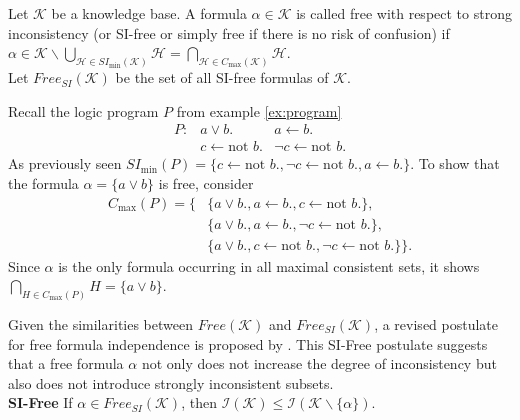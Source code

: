 \begin{definition}
    Let \(\mathcal{K}\) be a knowledge base. A formula \(\alpha \in \mathcal{K}\) is called free with respect to strong inconsistency (or SI-free or simply free if there is no risk of confusion) if\\
    \(\alpha \in \mathcal{K} \backslash \bigcup\limits_{\mathcal{H} \in SI_{\min}(\mathcal{K})} \mathcal{H} = \bigcap\limits_{\mathcal{H} \in C_{\max}(\mathcal{K})} \mathcal{H}\).\\
    Let \(Free_{SI}(\mathcal{K})\) be the set of all SI-free formulas of \(\mathcal{K}\).
\end{definition}

\begin{example}
    Recall the logic program \(P\) from example \ref{ex:program}
    \[\begin{array}{rrr}
            P: & a \lor b.                  & a \leftarrow b.                 \\
               & c \leftarrow \text{not }b. & \neg c \leftarrow \text{not }b.
        \end{array}\]
    As previously seen \(SI_{\min}(P) = \{c \leftarrow \text{not }b., \neg c \leftarrow \text{not }b., a \leftarrow b.\}\). To show that the formula \(\alpha = \{a \lor b\}\) is free, consider
    \begin{align*}
        C_{\max}(P) = \{ & \{a \lor b., a \leftarrow b., c \leftarrow \text{not }b.\},                   \\
                         & \{a \lor b., a \leftarrow b., \neg c \leftarrow \text{not }b.\},              \\
                         & \{a \lor b., c \leftarrow \text{not }b., \neg c \leftarrow \text{not }b.\}\}.
    \end{align*}
    Since \(\alpha\) is the only formula occurring in all maximal consistent sets, it shows \(\bigcap_{H \in C_{\max}(P)} H = \{a \lor b\}\).
\end{example}

Given the similarities between \(Free(\mathcal{K})\) and \(Free_{SI}(\mathcal{K})\), a revised postulate for free formula independence is proposed by \cite{ulbricht_handling_2020}. This SI-Free postulate suggests that a free formula \(\alpha\) not only does not increase the degree of inconsistency but also does not introduce strongly inconsistent subsets.
\\
\textbf{SI-Free}
If \(\alpha \in Free_{SI}(\mathcal{K})\), then \(\mathcal{I}(\mathcal{K}) \leq \mathcal{I}(\mathcal{K} \backslash \{\alpha\})\).

